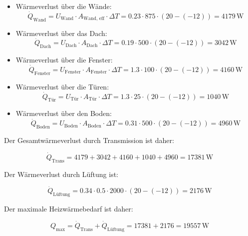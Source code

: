\documentclass{article}
\begin{document}
\begin{itemize}
    \item Wärmeverlust über die Wände:
    \begin{equation}
    \dot{Q}_\text{Wand} = U_\text{Wand} \cdot A_\text{Wand, eff} \cdot \Delta T = 0.23 \cdot 875 \cdot (20 - (-12)) = 4179 \, \text{W}
    \end{equation}
    
    \item Wärmeverlust über das Dach:
    \begin{equation}
    \dot{Q}_\text{Dach} = U_\text{Dach} \cdot A_\text{Dach} \cdot \Delta T = 0.19 \cdot 500 \cdot (20 - (-12)) = 3042 \, \text{W}
    \end{equation}
    
    \item Wärmeverlust über die Fenster:
    \begin{equation}
    \dot{Q}_\text{Fenster} = U_\text{Fenster} \cdot A_\text{Fenster} \cdot \Delta T = 1.3 \cdot 100 \cdot (20 - (-12)) = 4160 \, \text{W}
    \end{equation}
    
    \item Wärmeverlust über die Türen:
    \begin{equation}
    \dot{Q}_\text{Tür} = U_\text{Tür} \cdot A_\text{Tür} \cdot \Delta T = 1.3 \cdot 25 \cdot (20 - (-12)) = 1040 \, \text{W}
    \end{equation}
    
    \item Wärmeverlust über den Boden:
    \begin{equation}
    \dot{Q}_\text{Boden} = U_\text{Boden} \cdot A_\text{Boden} \cdot \Delta T = 0.31 \cdot 500 \cdot (20 - (-12)) = 4960 \, \text{W}
    \end{equation}
\end{itemize}

Der Gesamtwärmeverlust durch Transmission ist daher:

\begin{equation}
\dot{Q}_\text{Trans} = 4179 + 3042 + 4160 + 1040 + 4960 = 17381 \, \text{W}
\end{equation}

Der Wärmeverlust durch Lüftung ist:

\begin{equation}
\dot{Q}_\text{Lüftung} = 0.34 \cdot 0.5 \cdot 2000 \cdot (20 - (-12)) = 2176 \, \text{W}
\end{equation}

Der maximale Heizwärmebedarf ist daher:

\begin{equation}
Q_\text{max} = \dot{Q}_\text{Trans} + \dot{Q}_\text{Lüftung} = 17381 + 2176 = 19557 \, \text{W}
\end{equation}
\end{document}
